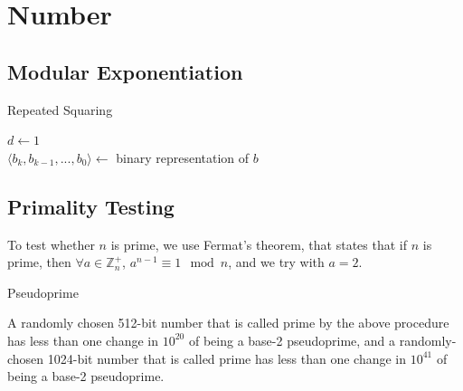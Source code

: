 \documentclass[a4paper, 12pt]{article}
\begin{document}
\section{Number}

  \subsection{Modular Exponentiation}

\vspace{0.5cm}
\IncMargin{2em}
\begin{algorithm}[H]
\caption{Repeated Squaring}
\vspace{0.1cm}
\Indm
{}
\Indp
\vspace{0.1cm}
$d\gets1$\\
$\langle b_k, b_{k-1}, ..., b_0\rangle\gets$ binary representation of $b$\\
\end{algorithm}
\DecMargin{2em}
\vspace{0.5cm}

  \subsection{Primality Testing}

To test whether $n$ is prime, we use Fermat's theorem, that states that if $n$ is prime, then $\forall a \in\mathbb{Z}_n^+$, $a^{n-1} \equiv 1\mod{n}$, and we try with $a=2$.

\vspace{0.5cm}
\IncMargin{2em}
\begin{algorithm}[H]
\caption{Pseudoprime}
\vspace{0.1cm}
\Indm
{}
\Indp
\vspace{0.1cm}
\end{algorithm}
\DecMargin{2em}
\vspace{0.5cm}

A randomly chosen 512-bit number that is called prime by the above procedure has less than one change in $10^{20}$ of being a base-2 pseudoprime, and a randomly-chosen 1024-bit number that is called prime has less than one change in $10^{41}$ of being a base-2 pseudoprime.
\end{document}
